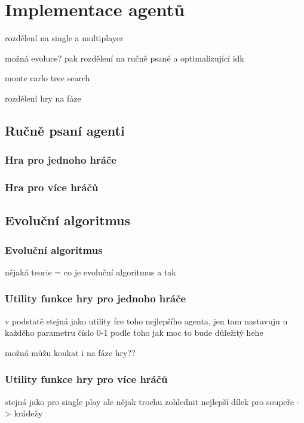 \chapter{Implementace agentů}

rozdělení na single a multiplayer

možná evoluce? pak rozdělení na ručně psané a optimalizující idk

monte carlo tree search

rozdělení hry na fáze

\section{Ručně psaní agenti}
\subsection{Hra pro jednoho hráče}
\subsection{Hra pro více hráčů}

\section{Evoluční algoritmus}
\subsection{Evoluční algoritmus}
nějaká teorie = co je evoluční algoritmus a tak
\subsection{Utility funkce hry pro jednoho hráče}

v podstatě stejná jako utility fce toho nejlepšího agenta, jen tam nastavuju u každého parametru číslo 0-1 podle toho jak moc to bude důležitý hehe

možná můžu koukat i na fáze hry??


\subsection{Utility funkce hry pro více hráčů}

stejná jako pro single play ale nějak trochu zohlednit nejlepší dílek pro soupeře -> krádežy

